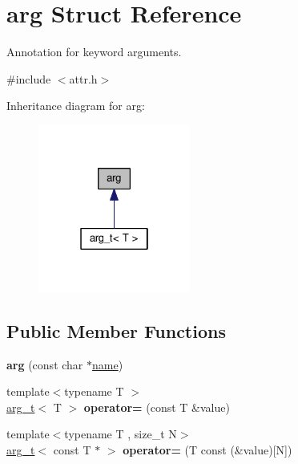 \hypertarget{structarg}{}\section{arg Struct Reference}
\label{structarg}


Annotation for keyword arguments.  




{\ttfamily \#include $<$attr.\+h$>$}



Inheritance diagram for arg\+:
\nopagebreak
\begin{figure}[H]
\begin{center}
\leavevmode
\includegraphics[width=142pt]{structarg__inherit__graph}
\end{center}
\end{figure}
\subsection*{Public Member Functions}
\begin{DoxyCompactItemize}
\item 
{\bfseries arg} (const char $\ast$\hyperlink{structname}{name})\hypertarget{structarg_a4e58e749509b42e0aa347bd4920b6ea1}{}\label{structarg_a4e58e749509b42e0aa347bd4920b6ea1}

\item 
{\footnotesize template$<$typename T $>$ }\\\hyperlink{structarg__t}{arg\+\_\+t}$<$ T $>$ {\bfseries operator=} (const T \&value)\hypertarget{structarg_a288968d3bbac976d8a7f2bf3d9a4f259}{}\label{structarg_a288968d3bbac976d8a7f2bf3d9a4f259}

\item 
{\footnotesize template$<$typename T , size\+\_\+t N$>$ }\\\hyperlink{structarg__t}{arg\+\_\+t}$<$ const T $\ast$ $>$ {\bfseries operator=} (T const (\&value)\mbox{[}N\mbox{]})\hypertarget{structarg_a9069ccd0b36a88e41a30eab059214f1a}{}\label{structarg_a9069ccd0b36a88e41a30eab059214f1a}

\end{DoxyCompactItemize}
